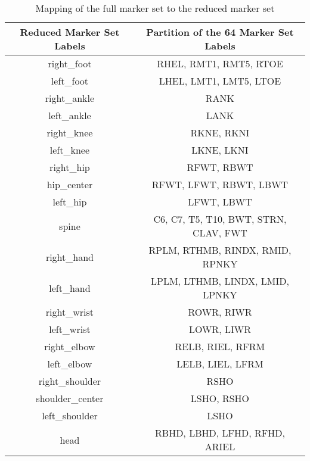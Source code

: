 \begin{table}[H]
    \centering
    \begin{tabular}{||c||c||}
        \hline
        \textbf{Reduced Marker Set Labels} & \textbf{Partition of the 64 Marker Set Labels} \\
        \hline
        right\_foot & RHEL, RMT1, RMT5, RTOE \\
        left\_foot & LHEL, LMT1, LMT5, LTOE \\
        right\_ankle & RANK \\
        left\_ankle & LANK \\
        right\_knee & RKNE, RKNI \\
        left\_knee & LKNE, LKNI \\
        right\_hip & RFWT, RBWT \\
        hip\_center & RFWT, LFWT, RBWT, LBWT \\
        left\_hip & LFWT, LBWT \\
        spine & C6, C7, T5, T10, BWT, STRN, CLAV, FWT \\
        right\_hand & RPLM, RTHMB, RINDX, RMID, RPNKY\\
        left\_hand & LPLM, LTHMB, LINDX, LMID, LPNKY \\
        right\_wrist & ROWR, RIWR \\
        left\_wrist & LOWR, LIWR \\
        right\_elbow & RELB, RIEL, RFRM\\
        left\_elbow & LELB, LIEL, LFRM \\
        right\_shoulder & RSHO \\
        shoulder\_center & LSHO, RSHO \\
        left\_shoulder & LSHO \\
        head & RBHD, LBHD, LFHD, RFHD, ARIEL \\
        \hline
    \end{tabular}
    \caption{Mapping of the full marker set to the reduced marker set}
    \label{tab:marker_mapping_64}
\end{table}

